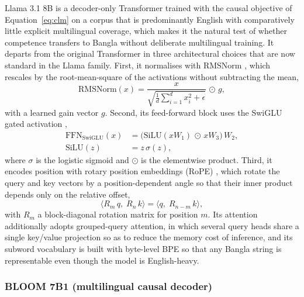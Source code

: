 Llama 3.1 8B \cite{dubey2024llama3} is a decoder-only Transformer trained with the causal objective of Equation~\eqref{eq:clm} on a corpus that is predominantly English with comparatively little explicit multilingual coverage, which makes it the natural test of whether competence transfers to Bangla without deliberate multilingual training. It departs from the original Transformer in three architectural choices that are now standard in the Llama family. First, it normalises with RMSNorm \cite{zhang2019rmsnorm}, which rescales by the root-mean-square of the activations without subtracting the mean,
\begin{equation}
\label{eq:rmsnorm}
\mathrm{RMSNorm}(x) = \frac{x}{\sqrt{\frac{1}{d}\sum_{i=1}^{d} x_i^{2} + \epsilon}}\,\odot\, g,
\end{equation}
with a learned gain vector $g$. Second, its feed-forward block uses the SwiGLU gated activation \cite{shazeer2020glu},
\begin{equation}
\label{eq:swiglu}
\begin{aligned}
\mathrm{FFN}_{\mathrm{SwiGLU}}(x) &= \big(\mathrm{SiLU}(xW_1)\,\odot\,xW_3\big)\,W_2, \\
\mathrm{SiLU}(z) &= z\,\sigma(z),
\end{aligned}
\end{equation}
where $\sigma$ is the logistic sigmoid and $\odot$ is the elementwise product. Third, it encodes position with rotary position embeddings (RoPE) \cite{su2021roformer}, which rotate the query and key vectors by a position-dependent angle so that their inner product depends only on the relative offset,
\begin{equation}
\label{eq:rope}
\langle R_m\,q,\; R_n\,k\rangle = \langle q,\; R_{n-m}\,k\rangle,
\end{equation}
with $R_m$ a block-diagonal rotation matrix for position $m$. Its attention additionally adopts grouped-query attention, in which several query heads share a single key/value projection so as to reduce the memory cost of inference, and its subword vocabulary is built with byte-level BPE so that any Bangla string is representable even though the model is English-heavy.

\subsubsection{BLOOM 7B1 (multilingual causal decoder)}

